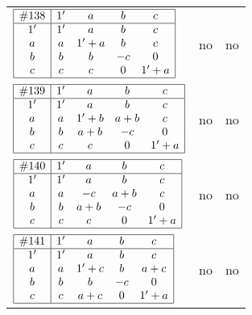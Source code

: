 \documentclass[12pt]{article}
\theoremstyle{definition}
\newcommand{\join}{\mathbin{+}}%
\newcommand{\id}{{1'}}%
\begin{document}
\begin{center}
\begin{longtable}{l|c|c}
$
\begin{array}{|c|cccc|} \hline
\#138 & \id & a & b & c \\ \hline
\id & \id & a & b & c \\
a & a & \id \join a & b & c \\
b & b & b & -c & 0 \\
c & c & c & 0 & \id \join a \\ \hline
\end{array}
$
 & no  
 & no      \\[15mm]

$
\begin{array}{|c|cccc|} \hline
\#139 & \id & a & b & c \\ \hline
\id & \id & a & b & c \\
a & a & \id \join b & a \join b & c \\
b & b & a \join b & -c & 0 \\
c & c & c & 0 & \id \join a \\ \hline
\end{array}
$
 & no  
 & no      \\[15mm]

$
\begin{array}{|c|cccc|} \hline
\#140 & \id & a & b & c \\ \hline
\id & \id & a & b & c \\
a & a & -c & a \join b & c \\
b & b & a \join b & -c & 0 \\
c & c & c & 0 & \id \join a \\ \hline
\end{array}
$
 & no  
 & no      \\[15mm]

$
\begin{array}{|c|cccc|} \hline
\#141 & \id & a & b & c \\ \hline
\id & \id & a & b & c \\
a & a & \id \join c & b & a \join c \\
b & b & b & -c & 0 \\
c & c & a \join c & 0 & \id \join a \\ \hline
\end{array}
$
 & no  
 & no      \\[15mm]


\end{longtable}
\end{center}
\end{document}
